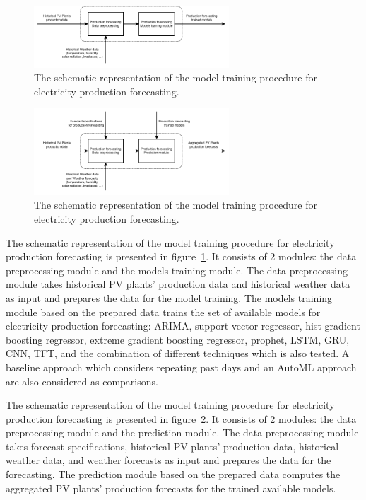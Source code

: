 \begin{figure}[H]
\centering
\includegraphics[width=0.65\textwidth]{images/system_model_training_production}
\caption{The schematic representation of the model training procedure for electricity production forecasting.}
\label{fig:modeltrainingproduction}
\end{figure}

\begin{figure}[H]
\centering
\includegraphics[width=0.65\textwidth]{images/system_model_forecasting_production}
\caption{The schematic representation of the model training procedure for electricity production forecasting.}
\label{fig:modelforecastingproduction}
\end{figure}

The schematic representation of the model training procedure for electricity production forecasting is presented in figure~\ref{fig:modeltrainingproduction}.
It consists of 2 modules: the data preprocessing module and the models training module.
The data preprocessing module takes historical PV plants' production data and historical weather data as input and prepares the data for the model training.
The models training module based on the prepared data trains the set of available models for electricity production forecasting: ARIMA, support vector regressor, hist gradient boosting regressor, extreme gradient boosting regressor, prophet, LSTM, GRU, CNN, TFT, and the combination of different techniques which is also tested.
A baseline approach which considers repeating past days and an AutoML approach are also considered as comparisons.

The schematic representation of the model training procedure for electricity production forecasting is presented in figure~\ref{fig:modelforecastingproduction}.
It consists of 2 modules: the data preprocessing module and the prediction module.
The data preprocessing module takes forecast specifications, historical PV plants' production data, historical weather data, and weather forecasts as input and prepares the data for the forecasting.
The prediction module based on the prepared data computes the aggregated PV plants' production forecasts for the trained available models.
